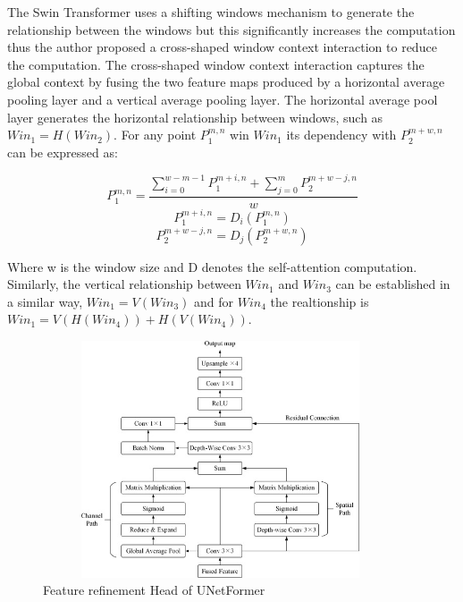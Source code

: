 The Swin Transformer uses a shifting windows mechanism to generate the relationship between the windows but this significantly increases the computation thus the author proposed  a cross-shaped window context interaction to reduce the computation. The cross-shaped window context interaction captures the global context by fusing the two feature maps produced by a horizontal average pooling layer and a vertical average pooling layer. The horizontal average pool layer generates the horizontal relationship between windows, such as $Win_1 = H(Win_2)$. For any point $P^{m,n}_1$ win $Win_1$ its dependency with $P^{m+w,n}_2$ can be expressed as:

\begin{equation}
    P^{m,n}_1 = \frac{\sum^{w-m-1}_{i=0}P^{m+i,n}_1 + \sum^m_{j=0}P^{m+w-j,n}_2}{w}
\end{equation}
\begin{equation}
    P^{m+i,n}_1 = D_i (P^{m,n}_1)
\end{equation}
\begin{equation}
    P^{m+w-j,n}_2 = D_j(P^{m+w,n}_2)
\end{equation}

\FloatBarrier
Where w is the window size and D denotes the self-attention computation. Similarly, the vertical relationship between $Win_1$ and $Win_3$ can be established in a similar way, $Win_1 = V(Win_3)$ and for $Win_4$ the realtionship is $Win_1 = V(H(Win_4)) + H(V(Win_4))$. 

\FloatBarrier

\begin{figure}[ht]
\includegraphics[width=10.5cm, height=7cm]{images/frh.jpg}
\centering
\caption{Feature refinement Head of UNetFormer \protect\cite{unetformer}}
\label{fig:frh}
\end{figure}

\FloatBarrier

